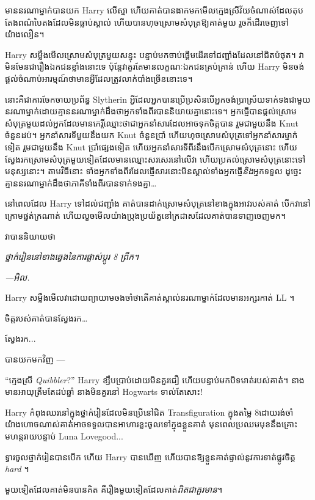{{{{មាននរណាម្នាក់បានយក Harry លើស្មា ហើយគាត់បានងាកមកមើលក្មេងស្រីវ័យចំណាស់ដែលតុបតែងពណ៌បៃតងដែលមិនធ្លាប់ស្គាល់ ហើយបានហុចស្រោមសំបុត្រឱ្យគាត់មួយ រួចក៏ដើរចេញទៅយ៉ាងលឿន។

Harry សម្លឹងមើលស្រោមសំបុត្រមួយសន្ទុះ បន្ទាប់មកចាប់ផ្តើមដើរទៅជញ្ជាំងដែលនៅជិតបំផុត។ វាមិនមែនជារឿងឯកជនខ្លាំងនោះទេ ប៉ុន្តែវាគួរតែមានលក្ខណៈឯកជនគ្រប់គ្រាន់ ហើយ Harry មិនចង់ផ្តល់ចំណាប់អារម្មណ៍ថាមានអ្វីដែលត្រូវលាក់បាំងច្រើននោះទេ។

នោះគឺជាការចែកចាយប្រព័ន្ធ Slytherin អ្វីដែលអ្នកបានប្រើប្រសិនបើអ្នកចង់ប្រាស្រ័យទាក់ទងជាមួយនរណាម្នាក់ដោយគ្មាននរណាម្នាក់ដឹងថាអ្នកទាំងពីរបាននិយាយគ្នានោះទេ។ អ្នក​ផ្ញើ​បាន​ផ្តល់​ស្រោម​សំបុត្រ​មួយ​ដល់​អ្នក​ដែល​មាន​កេរ្តិ៍​ឈ្មោះ​ថា​ជា​អ្នក​នាំ​សារ​ដែល​អាច​ទុក​ចិត្ត​បាន រួម​ជាមួយ​នឹង Knut ចំនួន​ដប់។ អ្នកនាំសារទីមួយនឹងយក Knut ចំនួនប្រាំ ហើយហុចស្រោមសំបុត្រទៅអ្នកនាំសារម្នាក់ទៀត រួមជាមួយនឹង Knut ប្រាំផ្សេងទៀត ហើយអ្នកនាំសារទីពីរនឹងបើកស្រោមសំបុត្រនោះ ហើយស្វែងរកស្រោមសំបុត្រមួយទៀតដែលមានឈ្មោះសរសេរនៅលើវា ហើយប្រគល់ស្រោមសំបុត្រនោះទៅមនុស្សនោះ។ តាមវិធីនោះ ទាំងអ្នកទាំងពីរដែលផ្ញើសារនោះមិនស្គាល់ទាំងអ្នកផ្ញើ\emph{និង}អ្នកទទួល ដូច្នេះគ្មាននរណាម្នាក់ដឹងថាភាគីទាំងពីរបានទាក់ទងគ្នា…

នៅពេលដែល Harry ទៅដល់ជញ្ជាំង គាត់បានដាក់ស្រោមសំបុត្រនៅខាងក្នុងអាវរបស់គាត់ បើកវានៅក្រោមផ្នត់ក្រណាត់ ហើយលួចមើលយ៉ាងប្រុងប្រយ័ត្ននៅក្រដាសដែលគាត់បានទាញចេញមក។

វាបាននិយាយថា

\emph{ថ្នាក់រៀននៅខាងឆ្វេងនៃការផ្លាស់ប្តូរ 8 ព្រឹក។}

\emph{—អិល.}

Harry សម្លឹងមើលវាដោយព្យាយាមចងចាំថាតើគាត់ស្គាល់នរណាម្នាក់ដែលមានអក្សរកាត់ LL ។

ចិត្តរបស់គាត់បានស្វែងរក…

ស្វែងរក...

បានយកមកវិញ —

“ក្មេងស្រី \emph{Quibbler}?” Harry ខ្សឹបប្រាប់ដោយមិនគួរជឿ ហើយបន្ទាប់មកបិទមាត់របស់គាត់។ នាង​មាន​អាយុ​ត្រឹម​តែ​ដប់​ឆ្នាំ នាង​មិន​គួរ​នៅ Hogwarts ទាល់​តែ​សោះ!


Harry កំពុងឈរនៅក្នុងថ្នាក់រៀនដែលមិនប្រើនៅជិត Transfiguration ក្នុងតម្លៃ 8\am ដោយរង់ចាំ យ៉ាងហោចណាស់គាត់អាចទទួលបានអាហារខ្លះចូលទៅក្នុងខ្លួនគាត់ មុនពេលប្រឈមមុខនឹងគ្រោះមហន្តរាយបន្ទាប់ Luna Lovegood...

ទ្វារចូលថ្នាក់រៀនបានបើក ហើយ Harry បានឃើញ ហើយបានឱ្យខ្លួនគាត់ផ្ទាល់នូវការទាត់ផ្លូវចិត្ត \emph{ hard} ។

មួយ​ទៀត​ដែល​គាត់​មិន​បាន​គិត គឺ​រឿង​មួយ​ទៀត​ដែល​គាត់​\emph{ពិត​ជា​គួរ​មាន}។

}}}}
